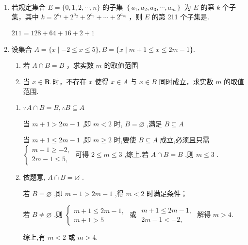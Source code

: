 \begin{enumerate}
    \item 若规定集合 $E = \{ 0,1,2,\cdots ,n\}$ 的子集 $\left\{  {{a}_{1},{a}_{2},{a}_{3},\cdots ,{a}_{m}}\right\}$ 为 $E$ 的第 $k$ 个子集，其中 $k = {2}^{{a}_{1}} + {2}^{{a}_{2}} + {2}^{{a}_{3}} + \cdots  + {2}^{{a}_{m}}$ ，则 $E$ 的第 211 个子集是.
    \begin{jieda}
        $211 = 128 + 64 + 16 + 2 + 1$
    \end{jieda}
    \item 设集合 $A = \{ x \mid   - 2 \leq  x \leq  5\} ,B = \{ x \mid  m + 1 \leq  x \leq  {2m} - 1\}$.
    \begin{enumerate}
        \item 若 $A \cap  B = B$ ，求实数 $m$ 的取值范围
        \item 当 $x \in  \mathbf{R}$ 时，不存在 $x$ 使得 $x \in  A$ 与 $x \in  B$ 同时成立，求实数 $m$ 的取值范围.
    \end{enumerate}
    \begin{jieda}
        \begin{enumerate}
            \item $\because A \cap  B = B,\therefore B \subseteq  A$
            
            当 $m + 1 > {2m} - 1$ ,即 $m < 2$ 时, $B = \varnothing$ ,满足 $B \subseteq  A$
            
            当 $m + 1 \leq  {2m} - 1$ ,即 $m \geq  2$ 时,要使 $B \subseteq  A$ 成立,必须且只需 $\left\{  \begin{array}{l} m + 1 \geq   - 2, \\  {2m} - 1 \leq  5, \end{array}\right.$ 可得 $2 \leq  m \leq  3$ ,综上,若 $A \cap  B = B$ ,则 $m \leq  3$ .
            \item 依题意, $A \cap  B = \varnothing$ . 
            
            若 $B = \varnothing$ ,即 $m + 1 > {2m} - 1$ ,得 $m < 2$ 时满足条件；
            
            若 $B \neq  \varnothing$ ,则 $\left\{  \begin{array}{l} m + 1 \leq  {2m} - 1, \\  m + 1 > 5 \end{array}\right.$ 或 $\begin{array}{l} m + 1 \leq  {2m} - 1, \\  {2m} - 1 <  - 2, \end{array}$ 解得 $m > 4$. 
            
            综上,有 $m < 2$ 或 $m > 4$.
        \end{enumerate}
    \end{jieda}
    

\end{enumerate}
